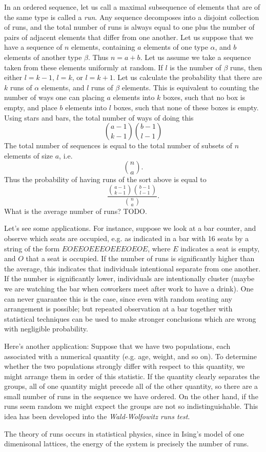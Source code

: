 \begin{example}
    In an ordered sequence, let us call a maximal subsequence of elements that are of the same type is called a \emph{run}. Any sequence decomposes into a disjoint collection of runs, and the total number of runs is always equal to one plus the number of pairs of adjacent elements that differ from one another. Let us suppose that we have a sequence of $n$ elements, containing $a$ elements of one type $\alpha$, and $b$ elements of another type $\beta$. Thus $n = a + b$. Let us assume we take a sequence taken from these elements uniformly at random. If $l$ is the number of $\beta$ runs, then either $l = k-1$, $l = k$, or $l = k+1$. Let us calculate the probability that there are $k$ runs of $\alpha$ elements, and $l$ runs of $\beta$ elements. This is equivalent to counting the number of ways one can placing $a$ elements into $k$ boxes, such that no box is empty, and place $b$ elements into $l$ boxes, such that none of these boxes is empty. Using stars and bars, the total number of ways of doing this
    \[ {{a-1} \choose {k - 1}} {{b-1} \choose {l-1}} \]
    The total number of sequences is equal to the total number of subsets of $n$ elements of size $a$, i.e.
    \[ {{n} \choose {a}}. \]
    Thus the probability of having runs of the sort above is equal to
    \[ \frac{{{a-1} \choose {k - 1}} {{b-1} \choose {l-1}}}{{{n} \choose {a}}}. \]
    What is the average number of runs? TODO.

    Let's see some applications. For instance, suppose we look at a bar counter, and observe which seats are occupied, e.g. as indicated in a bar with 16 seats by a string of the form $EOEEOEEEOEEEOEOE$, where $E$ indicates a seat is empty, and $O$ that a seat is occupied. If the number of runs is significantly higher than the average, this indicates that individuals intentional separate from one another. If the number is significantly lower, individuals are intentionally cluster (maybe we are watching the bar when coworkers meet after work to have a drink). One can never guarantee this is the case, since even with random seating any arrangement is possible; but repeated observation at a bar together with statistical techniques can be used to make stronger conclusions which are wrong with negligible probability.

    Here's another application: Suppose that we have two populations, each associated with a numerical quantity (e.g. age, weight, and so on). To determine whether the two populations strongly differ with respect to this quantity, we might arrange them in order of this statistic. If the quantity clearly separates the groups, all of one quantity might precede all of the other quantity, so there are a small number of runs in the sequence we have ordered. On the other hand, if the runs seem random we might expect the groups are not so indistinguishable. This idea has been developed into the \emph{Wald-Wolfowitz runs test}.

    The theory of runs occurs in statistical physics, since in Ising's model of one dimenisonal lattices, the energy of the system is precisely the number of runs.
\end{example}

